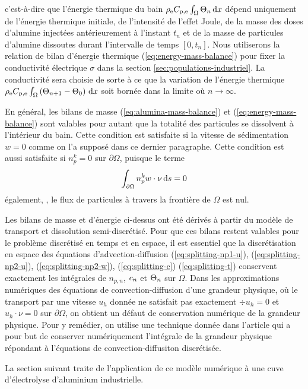 c'est-à-dire que l'énergie thermique du bain
$\rho_\mathrm{e}C_{\mathrm{p,e}}\int_\Omega\Theta_{n}\,\mathrm dx$
dépend uniquement de l'énergie thermique initiale, de l'intensité de
l'effet Joule, de la masse des doses d'alumine injectées
antérieurement à l'instant $t_n$ et de la masse de particules
d'alumine dissoutes durant l'intervalle de temps $[0, t_n]$. Nous
utiliserons la relation de bilan d'énergie thermique
(\ref{eq:energy-mass-balance}) pour fixer la conductivité électrique
$\sigma$ dans la section \ref{sec:populations-industriel}. La
conductivité sera choisie de sorte à ce que la variation de l'énergie
thermique $\rho_\mathrm{e} C_{\mathrm{p,e}} \int_\Omega
\left( \Theta_{n+1} - \Theta_0 \right)\,\mathrm dx$ soit bornée dans
la limite où $n\to\infty$.

\begin{remarque}
  En général, les bilans de masse (\ref{eq:alumina-mass-balance}) et
  (\ref{eq:energy-mass-balance}) sont valables pour autant que la
  totalité des particules se dissolvent à l'intérieur du bain. Cette
  condition est satisfaite si la vitesse de sédimentation $ w = 0$
  comme on l'a supposé dans ce dernier paragraphe. Cette condition est
  aussi satisfaite si $n_p^k = 0$ sur $\partial \Omega$, puisque le
  terme
  \begin{equation}
    \int_{\partial \Omega} n_p^k w\cdot \nu\,\mathrm ds = 0
  \end{equation}
  également, \ie, le flux de particules à travers la frontière de
  $\Omega$ est nul.
\end{remarque}

\begin{remarque}
  Les bilans de masse et d'énergie ci-dessus ont été dérivés à partir du
  modèle de transport et dissolution semi-discrétisé. Pour que ces
  bilans restent valables pour le problème discrétisé en temps et en
  espace, il est essentiel que la discrétisation en espace des équations
  d'advection-diffusion (\ref{eq:splitting-np1-u}),
  (\ref{eq:splitting-np2-u}), (\ref{eq:splitting-np2-w}),
  (\ref{eq:splitting-c}) (\ref{eq:splitting-t}) conservent exactement
  les intégrales de $n_{p,n}$, $c_n$ et
  $\Theta_n$ sur $\Omega$. Dans les approximations numériques
  des équations de convection-diffusion d'une grandeur physique,
  où le transport par une vitesse $u_h$ donnée ne satisfait pas
  exactement  $\div u_h = 0$ et $u_h\cdot \nu = 0$ sur $\partial
  \Omega$, on obtient un défaut de conservation numérique de
  la grandeur physique. Pour y remédier, on utilise une
  technique donnée dans l'article \cite{flotron2013b}  qui a pour but
  de conserver numériquement l'intégrale de la grandeur physique
  répondant à l'équations de convection-diffusiton discrétisée.
\end{remarque}

La section suivant traite de l'application de ce modèle numérique à
une cuve d'électrolyse d'aluminium industrielle.
